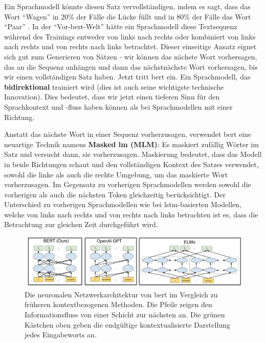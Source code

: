 \documentclass[
        ngerman,
        paper=a4,
        numbers=noendperiod,
]{scrreprt}
\begin{document}
Ein Sprachmodell könnte diesen Satz vervollständigen, indem es sagt, dass das Wort \enquote{Wagen} in 20\% der Fälle die Lücke füllt und in 80\% der Fälle das Wort \enquote{Paar} . In der \enquote{Vor-\ac{bert}-Welt} hätte ein Sprachmodell diese Textsequenz während des Trainings entweder von links nach rechts oder kombiniert von links nach rechts und von rechts nach links betrachtet. Dieser einseitige Ansatz eignet sich gut zum Generieren von Sätzen - wir können das nächste Wort vorhersagen, das an die Sequenz anhängen und dann das nächstnächste Wort vorhersagen, bis wir einen vollständigen Satz haben. Jetzt tritt \ac{bert} ein. Ein Sprachmodell, das \textbf{bidirektional} trainiert wird (dies ist auch seine wichtigste technische Innovation). Dies bedeutet, dass wir jetzt einen tieferen Sinn für den Sprachkontext und -fluss haben können als bei Sprachmodellen mit einer Richtung.

Anstatt das nächste Wort in einer Sequenz vorherzusagen, verwendet \ac{bert} eine neuartige Technik namens \textbf{Masked \ac{lm} (MLM)}: Es maskiert zufällig Wörter im Satz und versucht dann, sie vorherzusagen. Maskierung bedeutet, dass das Modell in beide Richtungen schaut und den vollständigen Kontext des Satzes verwendet, sowohl die linke als auch die rechte Umgebung, um das maskierte Wort vorherzusagen. Im Gegensatz zu vorherigen Sprachmodellen werden sowohl die vorherigen als auch die nächsten Token gleichzeitig berücksichtigt. Der Unterschied zu vorherigen Sprachmodellen wie bei \ac{lstm}-basierten Modellen, welche von links nach rechts und  von rechts nach links betrachten ist es, dass die Betrachtung zur gleichen Zeit durchgeführt wird.

\begin{figure}[H]
    \centering\includegraphics[width=1\linewidth]{images/bert.png}
    \caption[Netzwerkarchitektur von \ac{bert} im Vergleich zu früheren kontextbezogenen Methoden]{Die neuronalen Netzwerkarchitektur von \ac{bert} im Vergleich zu früheren kontextbezogenen Methoden. Die Pfeile zeigen den Informationsfluss von einer Schicht zur nächsten an. Die grünen Kästchen oben geben die endgültige kontextualisierte Darstellung jedes Eingabeworts an. \citep{GoogleProcessing}}
    \label{fig:bert}
\end{figure}
\end{document}
